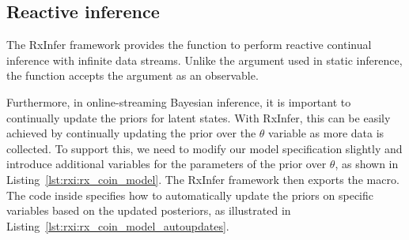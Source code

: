 \subsection{Reactive inference}

The RxInfer framework provides the  function to perform reactive
continual inference with infinite data streams.
Unlike the  argument used in static inference, the  function
accepts the  argument as an observable.

Furthermore, in online-streaming Bayesian inference, it is important to continually update the
priors for latent states.
With RxInfer, this can be easily achieved by continually updating the prior over the $\theta$
variable as more data is collected.
To support this, we need to modify our model specification slightly and introduce additional
 variables for the parameters of the prior over $\theta$, as shown in
Listing~\ref{lst:rxi:rx_coin_model}.
The RxInfer framework then exports the  macro.
The code inside  specifies how to automatically update the priors on
specific variables based on the updated posteriors, as illustrated in
Listing~\ref{lst:rxi:rx_coin_model_autoupdates}.
\begin{figure*}[h!]
  \begin{adjustbox}{minipage=\textwidth,margin=0pt \smallskipamount,center}
  \end{adjustbox}
\end{figure*}
\begin{figure*}[h!]
  \begin{adjustbox}{minipage=\textwidth,margin=0pt \smallskipamount,center}
  \end{adjustbox}
\end{figure*}


